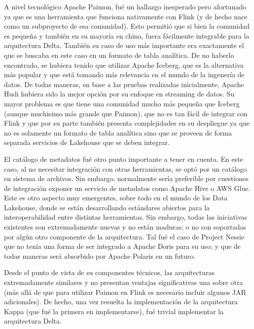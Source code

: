 \newpage

A nivel tecnológico Apache Paimon, fué un hallazgo inesperado pero afortunado ya que es una herramienta que funciona nativamente con Flink (y de hecho nace como un subproyecto de esa comunidad).
Esto permitió que si bien la comunidad es pequeña y también en su mayoría en chino, fuera fácilmente integrable para la arquitectura Delta. 
También su caso de uso más importante era exactamente el que se buscaba en este caso en un formato de tabla analítica. 
De no haberlo encontrado, se hubiera tenido que utilizar Apache Iceberg, que es la alternativa más popular y que está tomando más relevancia en el mundo de la ingenería de datos. 
De todas maneras, en base a las pruebas realizadas inicialmente, Apache Hudi hubiera sido la mejor opción por su enfoque en streaming de datos. 
Su mayor problema es que tiene una comunidad mucho más pequeña que Iceberg (aunque muchisimo más grande que Paimon), que no es tan fácil de integrar con Flink 
y que por su parte también presenta complejidades en su despliegue ya que no es solamente un formato de tabla analítica sino que se proveen de forma separada servicios de Lakehouse que se deben integrar. 

El catálogo de metadatos fué otro punto importante a tener en cuenta. En este caso, al no necesitar integración con otras herramientas,
se optó por un catálogo en sistema de archivos. Sin embargo, normalmente sería preferible por cuestiones de integración exponer un servicio de metadatos como Apache Hive o AWS Glue.
Este es otro aspecto muy emergentes, sobre todo en el mundo de los Data Lakehouse, donde se están desarrollando estándares abiertos para la interoperabilidad entre distintas herramientas.
Sin embargo, todas las iniciativas existentes son extremadamente nuevas y no están maduras; o no son soportadas por algún otro componente de la arquitectura. 
Tal fué el caso de Project Nessie que no tenía una forma de ser integrado a Apache Doris para su uso; y que de todas maneras será absorbido por Apache Polaris en un futuro.

Desde el punto de vista de su componentes técnicos, las arquitecturas extremadamente similares y no presentan ventajas significativas una sobre otra 
(más allá de que para utilizar Paimon en Flink es necesario incluir algunos JAR adicionales).
De hecho, una vez resuelta la implementación de la arquitectura Kappa (que fué la primera en implementarse), fué trivial implementar la arquitectura Delta. 

\newpage